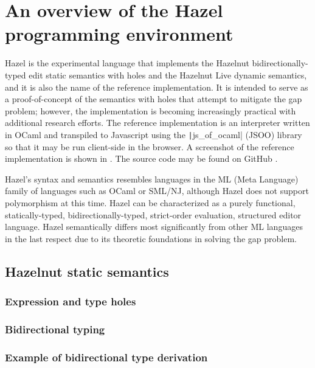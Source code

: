 \section{An overview of the Hazel programming environment}
\label{sec:hazel}


Hazel is the experimental language that implements the Hazelnut bidirectionally-typed edit static semantics with holes and the Hazelnut Live dynamic semantics, and it is also the name of the reference implementation. It is intended to serve as a proof-of-concept of the semantics with holes that attempt to mitigate the gap problem; however, the implementation is becoming increasingly practical with additional research efforts. The reference implementation is an interpreter written in OCaml and transpiled to Javascript using the \texttt|js_of_ocaml| (JSOO) library \cite{vouillon2014bytecode} so that it may be run client-side in the browser. A screenshot of the reference implementation is shown in  \cite{HazelDemo2022}. The source code may be found on GitHub \cite{Hazel2022}.

Hazel's syntax and semantics resembles languages in the ML (Meta Language) family of languages \cite{macqueen2020history} such as OCaml or SML/NJ, although Hazel does not support polymorphism at this time. Hazel can be characterized as a purely functional, statically-typed, bidirectionally-typed, strict-order evaluation, structured editor language. Hazel semantically differs most significantly from other ML languages in the last respect due to its theoretic foundations in solving the gap problem.

\subsection{Hazelnut static semantics}
\label{sec:statics}

\subsubsection{Expression and type holes}
\label{sec:holes}

\subsubsection{Bidirectional typing}
\label{sec:bidirectional_typing}

\subsubsection{Example of bidirectional type derivation}
\label{sec:typing_example}

